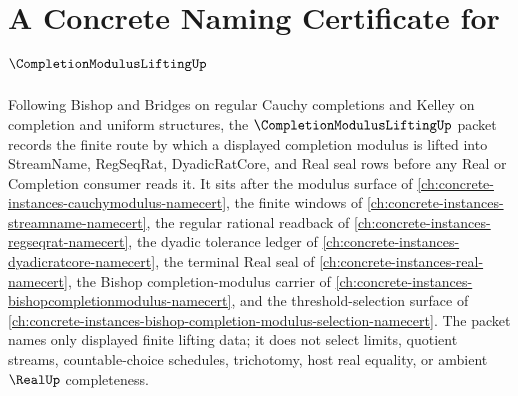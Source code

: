 \chapter{A Concrete Naming Certificate for $\CompletionModulusLiftingUp$}
\label{ch:concrete-instances-completion-modulus-lifting-namecert}

Following Bishop and Bridges on regular Cauchy completions and Kelley on completion and uniform structures, the $\CompletionModulusLiftingUp$ packet records the finite route by which a displayed completion modulus is lifted into StreamName, RegSeqRat, DyadicRatCore, and Real seal rows before any Real or Completion consumer reads it. It sits after the modulus surface of \autoref{ch:concrete-instances-cauchymodulus-namecert}, the finite windows of \autoref{ch:concrete-instances-streamname-namecert}, the regular rational readback of \autoref{ch:concrete-instances-regseqrat-namecert}, the dyadic tolerance ledger of \autoref{ch:concrete-instances-dyadicratcore-namecert}, the terminal Real seal of \autoref{ch:concrete-instances-real-namecert}, the Bishop completion-modulus carrier of \autoref{ch:concrete-instances-bishopcompletionmodulus-namecert}, and the threshold-selection surface of \autoref{ch:concrete-instances-bishop-completion-modulus-selection-namecert}. The packet names only displayed finite lifting data; it does not select limits, quotient streams, countable-choice schedules, trichotomy, host real equality, or ambient $\RealUp$ completeness.

